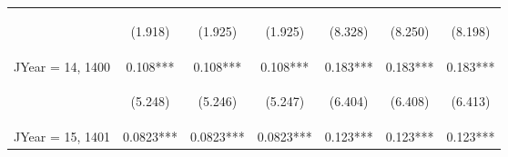\documentclass[]{article}
\begin{document}
\begin{center}
\begin{tabular}{lcccccc}
        \vspace{4pt}     & \begin{footnotesize}(1.918)\end{footnotesize}  & \begin{footnotesize}(1.925)\end{footnotesize}  & \begin{footnotesize}(1.925)\end{footnotesize}  & \begin{footnotesize}(8.328)\end{footnotesize}   & \begin{footnotesize}(8.250)\end{footnotesize}  & \begin{footnotesize}(8.198)\end{footnotesize}  \\
        JYear = 14, 1400 & 0.108***                                       & 0.108***                                       & 0.108***                                       & 0.183***                                        & 0.183***                                       & 0.183***                                       \\
        \vspace{4pt}     & \begin{footnotesize}(5.248)\end{footnotesize}  & \begin{footnotesize}(5.246)\end{footnotesize}  & \begin{footnotesize}(5.247)\end{footnotesize}  & \begin{footnotesize}(6.404)\end{footnotesize}   & \begin{footnotesize}(6.408)\end{footnotesize}  & \begin{footnotesize}(6.413)\end{footnotesize}  \\
        JYear = 15, 1401 & 0.0823***                                      & 0.0823***                                      & 0.0823***                                      & 0.123***                                        & 0.123***                                       & 0.123***                                       \\

\end{tabular}
\end{center}
\end{document}
